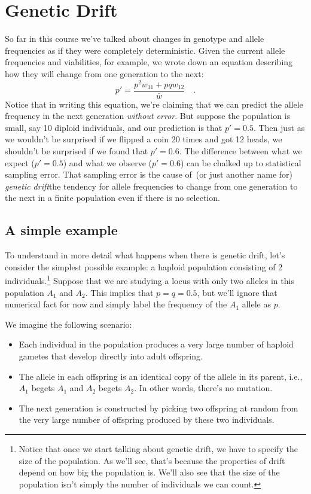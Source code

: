 \chapter{Genetic Drift}

So far in this course we've talked about changes in genotype and
allele frequencies as if they were completely deterministic. Given the
current allele frequencies and viabilities, for example, we wrote down
an equation describing how they will change from one generation to the
next:
\[
p' = \frac{p^2w_{11} + pqw_{12}}{\bar w} \quad .
\]
Notice that in writing this equation, we're claiming that we can
predict the allele frequency in the next generation {\it without
error}. But suppose the population is small, say 10 diploid
individuals, and our prediction is that $p' = 0.5$. Then just as we
wouldn't be surprised if we flipped a coin 20 times and got 12 heads,
we shouldn't be surprised if we found that $p' = 0.6$. The difference
between what we expect ($p' = 0.5$) and what we observe ($p' = 0.6$)
can be chalked up to statistical sampling error. That sampling error
is the cause of~(or just another name for) {\it genetic
drift}{\dash}the tendency for allele frequencies to change from one
generation to the next in a finite population even if there is no
selection.

\section*{A simple example}

To understand in more detail what happens when there is genetic drift,
let's consider the simplest possible example: a haploid population
consisting of 2 individuals.\footnote{Notice that once we start
  talking about genetic drift, we have to specify the size of the
  population. As we'll see, that's because the properties of drift
  depend on how big the population is. We'll also see that the size of
  the population isn't simply the number of individuals we can count.}
Suppose that we are studying a locus with only two alleles in this
population $A_1$ and $A_2$. This implies that $p = q = 0.5$, but we'll
ignore that numerical fact for now and simply label the frequency of
the $A_1$ allele as $p$.

We imagine the following scenario:

\begin{itemize}

\item Each individual in the population produces a very large number
  of haploid gametes that develop directly into adult offspring.

\item The allele in each offspring is an identical copy of the allele
  in its parent, i.e., $A_1$ begets $A_1$ and $A_2$ begets $A_2$. In
  other words, there's no mutation.

\item The next generation is constructed by picking two offspring at
  random from the very large number of offspring produced by these two
  individuals.

\end{itemize}

